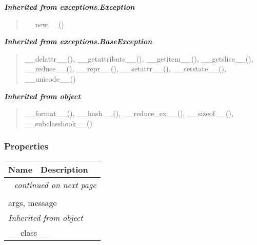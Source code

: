 \large{\textbf{\textit{Inherited from exceptions.Exception}}}

\begin{quote}
\_\_new\_\_()
\end{quote}

\large{\textbf{\textit{Inherited from exceptions.BaseException}}}

\begin{quote}
\_\_delattr\_\_(), \_\_getattribute\_\_(), \_\_getitem\_\_(), \_\_getslice\_\_(), \_\_reduce\_\_(), \_\_repr\_\_(), \_\_setattr\_\_(), \_\_setstate\_\_(), \_\_unicode\_\_()
\end{quote}

\large{\textbf{\textit{Inherited from object}}}

\begin{quote}
\_\_format\_\_(), \_\_hash\_\_(), \_\_reduce\_ex\_\_(), \_\_sizeof\_\_(), \_\_subclasshook\_\_()
\end{quote}


  \subsubsection{Properties}

    \vspace{-1cm}
\hspace{\varindent}\begin{longtable}{|p{\varnamewidth}|p{\vardescrwidth}|l}
\cline{1-2}
\cline{1-2} \centering \textbf{Name} & \centering \textbf{Description}& \\
\cline{1-2}
\endhead\cline{1-2}\multicolumn{3}{r}{\small\textit{continued on next page}}\\\endfoot\cline{1-2}
\endlastfoot\multicolumn{2}{|l|}{\textit{Inherited from exceptions.BaseException}}\\
\multicolumn{2}{|p{\varwidth}|}{\raggedright args, message}\\
\cline{1-2}
\multicolumn{2}{|l|}{\textit{Inherited from object}}\\
\multicolumn{2}{|p{\varwidth}|}{\raggedright \_\_class\_\_}\\
\cline{1-2}
\end{longtable}


